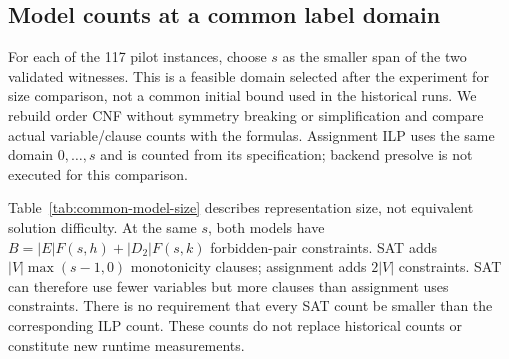 \subsection{Model counts at a common label domain}
For each of the 117 pilot instances, choose $s$ as the smaller span of the
two validated witnesses. This is a feasible domain selected after the
experiment for size comparison, not a common initial bound used in the
historical runs. We rebuild order CNF without symmetry breaking or
simplification and compare actual variable/clause counts with the formulas.
Assignment ILP uses the same domain $0,\ldots,s$ and is counted from its
specification; backend presolve is not executed for this comparison.

\begin{table}[htbp]
\caption{Model sizes at a common span.}
\centering\scriptsize

\label{tab:common-model-size}

\end{table}
Table~\ref{tab:common-model-size} describes representation size, not equivalent
solution difficulty. At the same $s$, both models have
$B=|E|F(s,h)+|D_2|F(s,k)$ forbidden-pair constraints. SAT adds
$|V|\max(s-1,0)$ monotonicity clauses; assignment adds $2|V|$ constraints.
SAT can therefore use fewer variables but more clauses than assignment uses
constraints. There is no requirement that every SAT count be smaller than
the corresponding ILP count. These counts do not replace historical counts
or constitute new runtime measurements.
